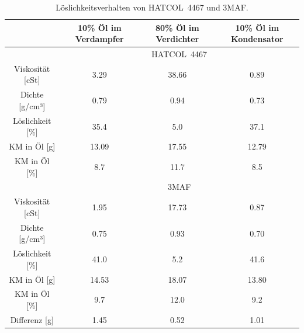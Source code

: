 \clearpage

\begin{table}[h!]
\centering
\caption{Löslichkeitsverhalten von HATCOL~4467 und 3MAF.}
\label{tab:LöslichkeitHC3M}
\begin{tabular}{|cccc|}
\hline
                                           & 10\% Öl im Verdampfer      & 80\% Öl im Verdichter     & 10\% Öl im Kondensator \\ \hline
\multicolumn{1}{|l}{}                      & \multicolumn{3}{c|}{HATCOL~4467}                                                  \\ \hline
\multicolumn{1}{|c|}{Viskosität {[}cSt{]}} & \multicolumn{1}{c|}{3.29}  & \multicolumn{1}{c|}{38.66} & 0.89                    \\
\multicolumn{1}{|c|}{Dichte {[}g/cm³{]}}   & \multicolumn{1}{c|}{0.79}  & \multicolumn{1}{c|}{0.94}  & 0.73                    \\
\multicolumn{1}{|c|}{Löslichkeit {[}\%{]}} & \multicolumn{1}{c|}{35.4}  & \multicolumn{1}{c|}{5.0}   & 37.1                    \\
\multicolumn{1}{|c|}{KM in Öl {[}g{]}}     & \multicolumn{1}{c|}{13.09} & \multicolumn{1}{c|}{17.55} & 12.79                   \\
\multicolumn{1}{|c|}{KM in Öl {[}\%{]}}    & \multicolumn{1}{c|}{8.7}     & \multicolumn{1}{c|}{11.7}    & 8.5                       \\ \hline
\multicolumn{1}{|l}{}                      & \multicolumn{3}{c|}{3MAF}                                                         \\ \hline
\multicolumn{1}{|c|}{Viskosität {[}cSt{]}} & \multicolumn{1}{c|}{1.95}  & \multicolumn{1}{c|}{17.73} & 0.87                    \\
\multicolumn{1}{|c|}{Dichte {[}g/cm³{]}}   & \multicolumn{1}{c|}{0.75}  & \multicolumn{1}{c|}{0.93}  & 0.70                    \\
\multicolumn{1}{|c|}{Löslichkeit {[}\%{]}} & \multicolumn{1}{c|}{41.0}  & \multicolumn{1}{c|}{5.2}   & 41.6                    \\
\multicolumn{1}{|c|}{KM in Öl {[}g{]}}     & \multicolumn{1}{c|}{14.53} & \multicolumn{1}{c|}{18.07} & 13.80                   \\
\multicolumn{1}{|c|}{KM in Öl {[}\%{]}}    & \multicolumn{1}{c|}{9.7}    & \multicolumn{1}{c|}{12.0}    & 9.2                       \\ \hline
\multicolumn{1}{|c|}{Differenz {[}g{]}}    & \multicolumn{1}{c|}{1.45}  & \multicolumn{1}{c|}{0.52}  & 1.01                    \\ \hline
\end{tabular}
\end{table}














